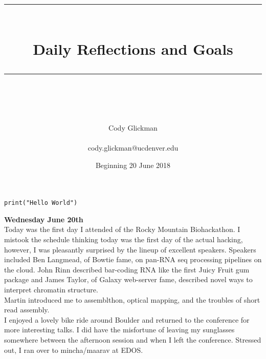 \documentclass[idxtotoc,hyperref,openany,oneside]{labbook} %
\newcommand{\HRule}{\rule{\linewidth}{0.5mm}} %
\begin{document}

\frontmatter %
\title{
\begin{center}
\HRule \\[0.4cm]
{\Huge \bfseries Daily Reflections and Goals \\[0.5cm] \Large} %
\HRule \\[1.5cm]
\end{center}
}
\author{\Huge Cody Glickman \\ \\ \LARGE cody.glickman@ucdenver.edu \\[2cm]} %
\date{Beginning 20 June 2018} %
\maketitle

\tableofcontents

\mainmatter %





\begin{lstlisting}
print("Hello World")
\end{lstlisting} 

\textbf{Wednesday June 20th} \\
Today was the first day I attended of the Rocky Mountain Biohackathon. I mistook the schedule thinking today was the first day of the actual hacking, however, I was pleasantly surprised by the lineup of excellent speakers. Speakers included Ben Langmead, of Bowtie fame, on pan-RNA seq processing pipelines on the cloud. John Rinn described bar-coding RNA like the first Juicy Fruit gum package and James Taylor, of Galaxy web-server fame, described novel ways to interpret chromatin structure. 
\\
Martin introduced me to assemblthon, optical mapping, and the troubles of short read assembly.
\\
I enjoyed a lovely bike ride around Boulder and returned to the conference for more interesting talks. I did have the misfortune of leaving my sunglasses somewhere between the afternoon session and when I left the conference. Stressed out, I ran over to mincha/maarav at EDOS. 
\end{document}
